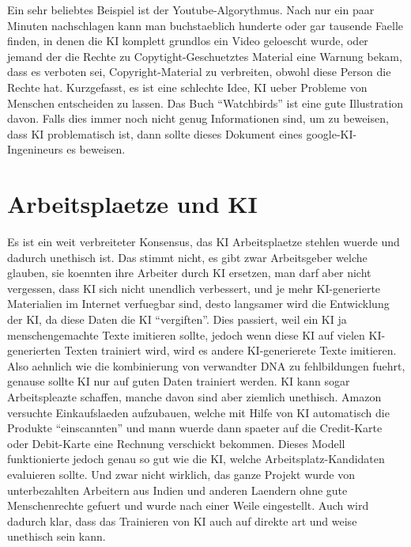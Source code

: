 \documentclass{report}
\begin{document}
\newline 
Ein sehr beliebtes Beispiel ist der Youtube-Algorythmus. Nach nur ein paar Minuten nachschlagen kann man buchstaeblich hunderte oder gar tausende Faelle finden, in denen die KI komplett grundlos ein Video geloescht wurde, oder jemand der die Rechte zu Copytight-Geschuetztes Material eine Warnung bekam, dass es verboten sei, Copyright-Material zu verbreiten, obwohl diese Person die Rechte hat.
\newline
Kurzgefasst, es ist eine schlechte Idee, KI ueber Probleme von Menschen entscheiden zu lassen. Das Buch \enquote{Watchbirds} ist eine gute Illustration davon. Falls dies immer noch nicht genug Informationen sind, um zu beweisen, dass KI problematisch ist, dann sollte dieses
Dokument \citep{google-enginner-says-big-ai-sucks}
eines google-KI-Ingenineurs es beweisen.
\section{Arbeitsplaetze und KI}
Es ist ein weit verbreiteter Konsensus, das KI Arbeitsplaetze stehlen wuerde und dadurch unethisch ist. Das stimmt nicht, es gibt zwar Arbeitsgeber welche glauben, sie koennten ihre Arbeiter durch KI ersetzen, man darf aber nicht vergessen, dass KI sich nicht unendlich verbessert, und je mehr KI-generierte Materialien im Internet verfuegbar sind, desto langsamer wird die Entwicklung der KI, da diese Daten die KI \enquote{vergiften}. Dies passiert, weil ein KI ja menschengemachte Texte imitieren sollte, jedoch wenn diese KI auf vielen KI-generierten Texten trainiert wird, wird es andere KI-generierete Texte imitieren. Also aehnlich wie die kombinierung von verwandter DNA zu fehlbildungen fuehrt, genause sollte KI nur auf guten Daten trainiert werden.
\newline
\newline
KI kann sogar Arbeitspleazte schaffen, manche davon sind aber ziemlich unethisch. Amazon versuchte Einkaufslaeden aufzubauen, welche mit Hilfe von KI automatisch die Produkte \enquote{einscannten} und mann wuerde dann spaeter auf die Credit-Karte oder Debit-Karte eine Rechnung verschickt bekommen.
\newline
Dieses Modell funktionierte jedoch genau so gut wie die KI, welche Arbeitsplatz-Kandidaten evaluieren sollte. Und zwar nicht wirklich, das ganze Projekt wurde von unterbezahlten Arbeitern aus Indien und anderen Laendern ohne gute Menschenrechte gefuert und wurde nach einer Weile eingestellt. Auch wird dadurch klar, dass das Trainieren von KI auch auf direkte art und weise unethisch sein kann.
\end{document}
